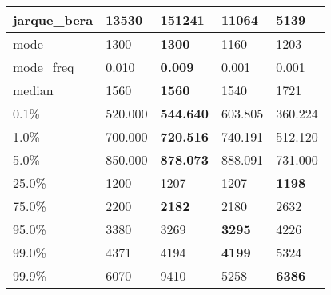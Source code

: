 \begin{table}[H]
\begin{tabular}{|l|m{10em}|m{10em}|m{10em}|m{10em}|}
\hline jarque\_bera & 13530 & \cellcolor[rgb]{0.9, 0.54, 0.52} 151241 & \bfseries 11064 & 5139 \\
\hline mode & 1300 & \bfseries 1300 & \cellcolor[rgb]{0.9, 0.54, 0.52} 1160 & 1203 \\
\hline mode\_freq & 0.010 & \bfseries 0.009 & \cellcolor[rgb]{0.9, 0.54, 0.52} 0.001 & 0.001 \\
\hline median & 1560 & \bfseries 1560 & 1540 & \cellcolor[rgb]{0.9, 0.54, 0.52} 1721 \\
\hline 0.1\% & 520.000 & \bfseries 544.640 & 603.805 & \cellcolor[rgb]{0.9, 0.54, 0.52} 360.224 \\
\hline 1.0\% & 700.000 & \bfseries 720.516 & 740.191 & \cellcolor[rgb]{0.9, 0.54, 0.52} 512.120 \\
\hline 5.0\% & 850.000 & \bfseries 878.073 & 888.091 & \cellcolor[rgb]{0.9, 0.54, 0.52} 731.000 \\
\hline 25.0\% & 1200 & 1207 & \cellcolor[rgb]{0.9, 0.54, 0.52} 1207 & \bfseries 1198 \\
\hline 75.0\% & 2200 & \bfseries 2182 & 2180 & \cellcolor[rgb]{0.9, 0.54, 0.52} 2632 \\
\hline 95.0\% & 3380 & 3269 & \bfseries 3295 & \cellcolor[rgb]{0.9, 0.54, 0.52} 4226 \\
\hline 99.0\% & 4371 & 4194 & \bfseries 4199 & \cellcolor[rgb]{0.9, 0.54, 0.52} 5324 \\
\hline 99.9\% & 6070 & \cellcolor[rgb]{0.9, 0.54, 0.52} 9410 & 5258 & \bfseries 6386 \\
\hline
\end{tabular}
\end{table}
